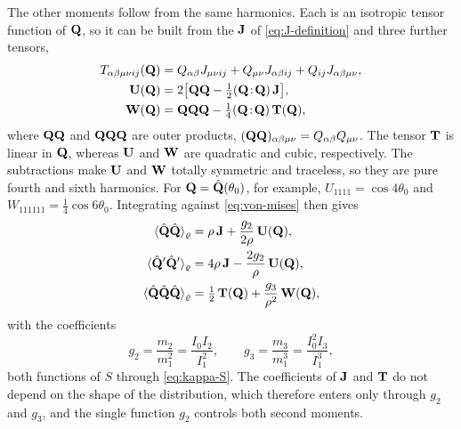 \documentclass[aps,pre,reprint,superscriptaddress,longbibliography,nofootinbib
]{revtex4-2}
\begin{document}
The other moments follow from the same harmonics. Each is
an isotropic tensor function of $\mathbf{Q}$, so it can be built
from the $\mathbf{J}$ of \cref{eq:J-definition} and three further
tensors,
\begin{align}
  \label{eq:tensor-basis}
  T_{{\alpha\beta\mu\nu} ij}(\mathbf{Q}) &= Q_{\alpha\beta} J_{{\mu\nu} ij}+Q_{\mu\nu} J_{{\alpha\beta} ij}+Q_{ij}J_{\alpha\beta\mu\nu},
  \nonumber\\
  \mathbf{U}(\mathbf{Q}) &= 2\bigl[\mathbf{Q}\mathbf{Q}-\tfrac12(\mathbf{Q}\!:\!\mathbf{Q})\,\mathbf{J}\bigr],
  \nonumber\\
  \mathbf{W}(\mathbf{Q}) &= \mathbf{Q}\mathbf{Q}\mathbf{Q}-\tfrac14(\mathbf{Q}\!:\!\mathbf{Q})\,\mathbf{T}(\mathbf{Q}),
\end{align}
where $\mathbf{Q}\mathbf{Q}$ and $\mathbf{Q}\mathbf{Q}\mathbf{Q}$ are outer products,
$(\mathbf{Q}\mathbf{Q})_{\alpha\beta\mu\nu}=Q_{\alpha\beta} Q_{\mu\nu}$. The tensor $\mathbf{T}$ is linear in
$\mathbf{Q}$, whereas $\mathbf{U}$ and $\mathbf{W}$ are quadratic and cubic,
respectively. The subtractions make $\mathbf{U}$ and $\mathbf{W}$ totally
symmetric and traceless, so they are pure fourth and sixth
harmonics. For $\mathbf{Q}=\hat{\mathbf{Q}}(\theta_0)$, for example,
$U_{1111}=\cos4\theta_0$ and
$W_{111111}=\tfrac14\cos6\theta_0$. Integrating against
\cref{eq:von-mises} then gives
\begin{align}
  \label{eq:exact-moments}
  \langle\hat{\mathbf{Q}}\hat{\mathbf{Q}}\rangle_\varrho &= \rho\,\mathbf{J}+\frac{g_2}{2\rho}\,\mathbf{U}(\mathbf{Q}),
  \nonumber\\
  \langle\hat{\mathbf{Q}}'\hat{\mathbf{Q}}'\rangle_\varrho &= 4\rho\,\mathbf{J}-\frac{2g_2}{\rho}\,\mathbf{U}(\mathbf{Q}),
  \nonumber\\
  \langle\hat{\mathbf{Q}}\hat{\mathbf{Q}}\hat{\mathbf{Q}}\rangle_\varrho &= \tfrac12\,\mathbf{T}(\mathbf{Q})+\frac{g_3}{\rho^2}\,\mathbf{W}(\mathbf{Q}),
\end{align}
with the coefficients
\begin{equation}
  \label{eq:g-coefficients}
  g_2=\frac{m_2}{m_1^2}=\frac{I_0I_2}{I_1^2},
  \qquad
  g_3=\frac{m_3}{m_1^3}=\frac{I_0^2I_3}{I_1^3},
\end{equation}
both functions of $S$ through \cref{eq:kappa-S}. The
coefficients of $\mathbf{J}$ and $\mathbf{T}$ do not depend on the shape
of the distribution, which therefore enters only through
$g_2$ and $g_3$, and the single function $g_2$ controls
both second moments.
\end{document}
